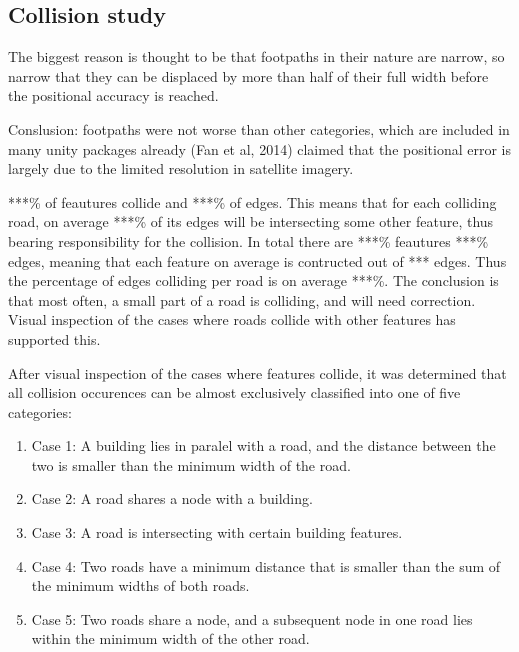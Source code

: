 \documentclass[a4paper]{article}
\begin{document}




\subsection{Collision study}

The biggest reason is thought to be that footpaths in their nature are narrow, so narrow that they can be displaced by more than half of their full width before the positional accuracy is reached.

Conslusion: footpaths were not worse than other categories, which are included in many unity packages already
(Fan et al, 2014) claimed that the positional error is largely due to the limited resolution in satellite imagery.

***\% of feautures collide and ***\% of edges.
This means that for each colliding road, on average ***\% of its edges will be intersecting some other feature, thus bearing responsibility for the collision.
In total there are ***\% feautures ***\% edges, meaning that each feature on average is contructed out of *** edges.
Thus the percentage of edges colliding per road is on average ***\%.
The conclusion is that most often, a small part of a road is colliding, and will need correction.
Visual inspection of the cases where roads collide with other features has supported this.

After visual inspection of the cases where features collide, it was determined that all collision occurences can be almost exclusively classified into one of five categories:

\begin{enumerate}
\item Case 1: A building lies in paralel with a road, and the distance between the two is smaller than the minimum width of the road.
\item Case 2: A road shares a node with a building.
\item Case 3: A road is intersecting with certain building features.
\item Case 4: Two roads have a minimum distance that is smaller than the sum of the minimum widths of both roads. 
\item Case 5: Two roads share a node, and a subsequent node in one road lies within the minimum width of the other road.
\end{enumerate}
\end{document}
